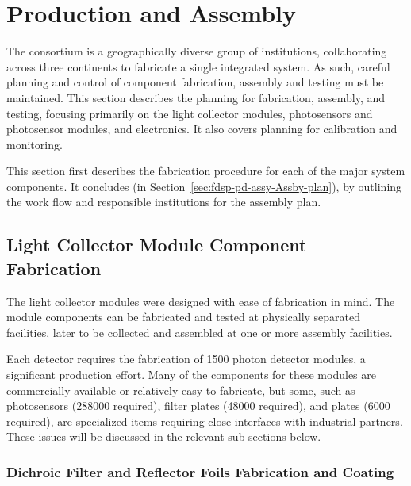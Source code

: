\section{Production and Assembly}
\label{sec:fdsp-pd-prod-assy}

The \single {} consortium is a geographically diverse group of institutions, collaborating across three continents to fabricate a single integrated system.  As such, careful planning and control of component fabrication, assembly and testing must be maintained.
This section describes the planning for fabrication, assembly, and testing, focusing primarily on the  light collector modules, photosensors and photosensor modules, and electronics. It also covers planning for  calibration and monitoring.
 
This section first describes the fabrication procedure for each of the major  system components.  It concludes (in Section~\ref{sec:fdsp-pd-assy-Assby-plan}), by outlining the work flow and responsible institutions for the assembly plan.

\subsection{Light Collector Module Component Fabrication}

The  light collector modules were designed with ease of fabrication in mind.  The module components can be fabricated and  tested at physically separated facilities, later to be collected and assembled at one or more assembly facilities. 

Each  detector requires the fabrication of \num{1500} photon detector modules, a significant production effort.  Many of the components for these modules are commercially available or relatively easy to fabricate, but some, such as photosensors (\num{288000} required), filter plates (\num{48000} required), and  plates (\num{6000} required), are specialized items requiring close interfaces with industrial partners.  These issues will be discussed in the relevant sub-sections below.   

\subsubsection{Dichroic Filter and Reflector Foils Fabrication and Coating}

